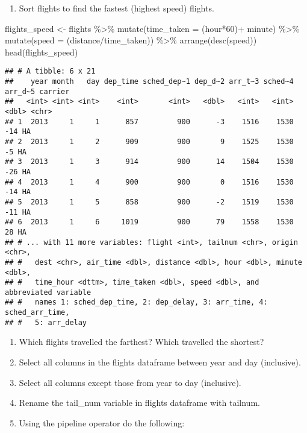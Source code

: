 \documentclass[
]{article}
\newenvironment{Shaded}{\begin{snugshade}}{\end{snugshade}}
\newcommand{\AttributeTok}[1]{\textcolor[rgb]{0.77,0.63,0.00}{#1}}
\newcommand{\DecValTok}[1]{\textcolor[rgb]{0.00,0.00,0.81}{#1}}
\newcommand{\FunctionTok}[1]{\textcolor[rgb]{0.00,0.00,0.00}{#1}}
\newcommand{\NormalTok}[1]{#1}
\newcommand{\OtherTok}[1]{\textcolor[rgb]{0.56,0.35,0.01}{#1}}
\newcommand{\SpecialCharTok}[1]{\textcolor[rgb]{0.00,0.00,0.00}{#1}}
\providecommand{\tightlist}{%
  \setlength{\itemsep}{0pt}\setlength{\parskip}{0pt}}
\begin{document}
\begin{enumerate}
\def\labelenumi{\arabic{enumi}.}
\setcounter{enumi}{7}
\tightlist
\item
  Sort flights to find the fastest (highest speed) flights.
\end{enumerate}

\begin{Shaded}
\begin{Highlighting}[]
\NormalTok{flights\_speed }\OtherTok{\textless{}{-}}\NormalTok{ flights }\SpecialCharTok{\%\textgreater{}\%}  \FunctionTok{mutate}\NormalTok{(}\AttributeTok{time\_taken =}\NormalTok{ (hour}\SpecialCharTok{*}\DecValTok{60}\NormalTok{)}\SpecialCharTok{+}\NormalTok{ minute) }\SpecialCharTok{\%\textgreater{}\%} \FunctionTok{mutate}\NormalTok{(}\AttributeTok{speed =}\NormalTok{ (distance}\SpecialCharTok{/}\NormalTok{time\_taken)) }\SpecialCharTok{\%\textgreater{}\%} \FunctionTok{arrange}\NormalTok{(}\FunctionTok{desc}\NormalTok{(speed))}
\FunctionTok{head}\NormalTok{(flights\_speed)}
\end{Highlighting}
\end{Shaded}

\begin{verbatim}
## # A tibble: 6 x 21
##    year month   day dep_time sched_dep~1 dep_d~2 arr_t~3 sched~4 arr_d~5 carrier
##   <int> <int> <int>    <int>       <int>   <dbl>   <int>   <int>   <dbl> <chr>  
## 1  2013     1     1      857         900      -3    1516    1530     -14 HA     
## 2  2013     1     2      909         900       9    1525    1530      -5 HA     
## 3  2013     1     3      914         900      14    1504    1530     -26 HA     
## 4  2013     1     4      900         900       0    1516    1530     -14 HA     
## 5  2013     1     5      858         900      -2    1519    1530     -11 HA     
## 6  2013     1     6     1019         900      79    1558    1530      28 HA     
## # ... with 11 more variables: flight <int>, tailnum <chr>, origin <chr>,
## #   dest <chr>, air_time <dbl>, distance <dbl>, hour <dbl>, minute <dbl>,
## #   time_hour <dttm>, time_taken <dbl>, speed <dbl>, and abbreviated variable
## #   names 1: sched_dep_time, 2: dep_delay, 3: arr_time, 4: sched_arr_time,
## #   5: arr_delay
\end{verbatim}

\begin{enumerate}
\def\labelenumi{\arabic{enumi}.}
\setcounter{enumi}{8}
\item
  Which flights travelled the farthest? Which travelled the shortest?
\item
  Select all columns in the flights dataframe between year and day
  (inclusive).
\item
  Select all columns except those from year to day (inclusive).
\item
  Rename the tail\_num variable in flights dataframe with tailnum.
\item
  Using the pipeline operator do the following:
\end{enumerate}
\end{document}
